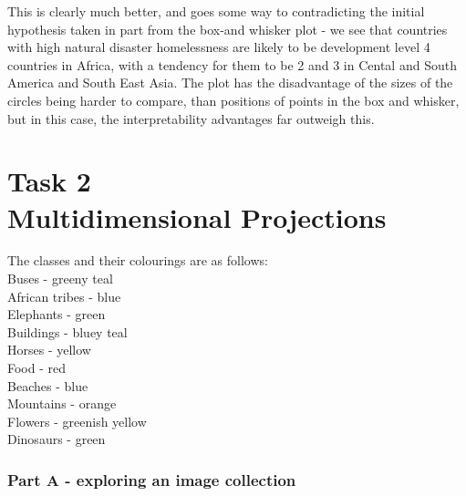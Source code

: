 \documentclass[ 10pt ]{fphw}
\begin{document}
This is clearly much better, and goes some way to contradicting the initial hypothesis taken in part from the box-and whisker plot - we see that countries with high natural disaster homelessness are likely to be development level 4 countries in Africa, with a tendency for them to be 2 and 3 in Cental and South America and South East Asia. The plot has the disadvantage of the sizes of the circles being harder to  compare, than positions of points in the box and whisker, but in this case, the interpretability advantages far outweigh this.


\vspace{2.0cm}


\section*{Task 2 \\ Multidimensional Projections}

The classes and their colourings are as follows:\\
Buses - greeny teal \\ 
African tribes - blue \\
Elephants - green \\ 
Buildings - bluey teal \\
Horses - yellow \\ 
Food - red \\
Beaches - blue \\ 
Mountains - orange\\
Flowers - greenish yellow\\
Dinosaurs - green

\subsubsection*{Part A - exploring an image collection}
\end{document}
